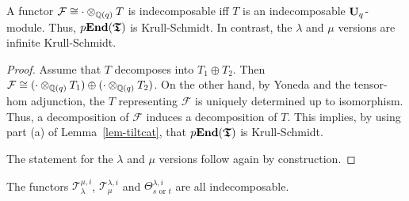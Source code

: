 \begin{lem}\label{lem-profuncinde}
A functor $\mathcal F\cong \cdot\otimes_{\mathbb{Q}(q)} T$ is 
indecomposable iff $T$ is an indecomposable 
$\boldsymbol{\mathrm{U}}_q$-module. Thus, $p\boldsymbol{\mathrm{End}}(\boldsymbol{\mathfrak{T}})$ is Krull-Schmidt. In contrast, the $\lambda$ and 
$\mu$ versions are infinite Krull-Schmidt.\makeqed
\end{lem}



\begin{proof}
Assume that $T$ decomposes 
into $T_1\oplus T_2$. Then $\mathcal{F}\cong (\cdot\otimes_{\mathbb{Q}(q)}T_1)\oplus (\cdot\otimes_{\mathbb{Q}(q)}T_2)$.
On the other hand, by Yoneda 
and the tensor-hom adjunction, 
the $T$ representing $\mathcal F$ is 
uniquely determined up to isomorphism. 
Thus, a decomposition of $\mathcal F$ 
induces a decomposition of $T$. This 
implies, by using 
part (a) of Lemma~\ref{lem-tiltcat}, that $p\boldsymbol{\mathrm{End}}(\boldsymbol{\mathfrak{T}})$ is Krull-Schmidt.

The statement for the $\lambda$ and $\mu$ 
versions follow again by construction.
\end{proof}





\begin{prop}\label{prop-profunc}
The functors $\mathcal T^{\mu,i}_{\lambda}$, $\mathcal T_{\mu}^{\lambda,i}$ and 
$\Theta^{\lambda,i}_{s\text{ or }t}$ are 
all indecomposable.
\end{prop}



